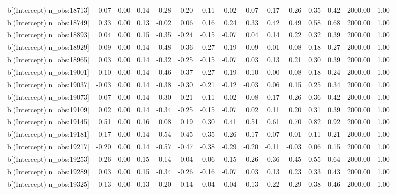 \begin{table}[ht]
\begin{tabular}{rrrrrrrrrrrrrrr}
  b[(Intercept) n\_obs:18713] & 0.07 & 0.00 & 0.14 & -0.28 & -0.20 & -0.11 & -0.02 & 0.07 & 0.17 & 0.26 & 0.35 & 0.42 & 2000.00 & 1.00 \\ 
  b[(Intercept) n\_obs:18749] & 0.33 & 0.00 & 0.13 & -0.02 & 0.06 & 0.16 & 0.24 & 0.33 & 0.42 & 0.49 & 0.58 & 0.68 & 2000.00 & 1.00 \\ 
  b[(Intercept) n\_obs:18893] & 0.04 & 0.00 & 0.15 & -0.35 & -0.24 & -0.15 & -0.07 & 0.04 & 0.14 & 0.22 & 0.32 & 0.39 & 2000.00 & 1.00 \\ 
  b[(Intercept) n\_obs:18929] & -0.09 & 0.00 & 0.14 & -0.48 & -0.36 & -0.27 & -0.19 & -0.09 & 0.01 & 0.08 & 0.18 & 0.27 & 2000.00 & 1.00 \\ 
  b[(Intercept) n\_obs:18965] & 0.03 & 0.00 & 0.14 & -0.32 & -0.25 & -0.15 & -0.07 & 0.03 & 0.13 & 0.21 & 0.30 & 0.39 & 2000.00 & 1.00 \\ 
  b[(Intercept) n\_obs:19001] & -0.10 & 0.00 & 0.14 & -0.46 & -0.37 & -0.27 & -0.19 & -0.10 & -0.00 & 0.08 & 0.18 & 0.24 & 2000.00 & 1.00 \\ 
  b[(Intercept) n\_obs:19037] & -0.03 & 0.00 & 0.14 & -0.38 & -0.30 & -0.21 & -0.12 & -0.03 & 0.06 & 0.15 & 0.25 & 0.34 & 2000.00 & 1.00 \\ 
  b[(Intercept) n\_obs:19073] & 0.07 & 0.00 & 0.14 & -0.30 & -0.21 & -0.11 & -0.02 & 0.08 & 0.17 & 0.26 & 0.36 & 0.42 & 2000.00 & 1.00 \\ 
  b[(Intercept) n\_obs:19109] & 0.02 & 0.00 & 0.14 & -0.34 & -0.25 & -0.15 & -0.07 & 0.02 & 0.11 & 0.20 & 0.31 & 0.39 & 2000.00 & 1.00 \\ 
  b[(Intercept) n\_obs:19145] & 0.51 & 0.00 & 0.16 & 0.08 & 0.19 & 0.30 & 0.41 & 0.51 & 0.61 & 0.70 & 0.82 & 0.92 & 2000.00 & 1.00 \\ 
  b[(Intercept) n\_obs:19181] & -0.17 & 0.00 & 0.14 & -0.54 & -0.45 & -0.35 & -0.26 & -0.17 & -0.07 & 0.01 & 0.11 & 0.21 & 2000.00 & 1.00 \\ 
  b[(Intercept) n\_obs:19217] & -0.20 & 0.00 & 0.14 & -0.57 & -0.47 & -0.38 & -0.29 & -0.20 & -0.11 & -0.03 & 0.06 & 0.15 & 2000.00 & 1.00 \\ 
  b[(Intercept) n\_obs:19253] & 0.26 & 0.00 & 0.15 & -0.14 & -0.04 & 0.06 & 0.15 & 0.26 & 0.36 & 0.45 & 0.55 & 0.64 & 2000.00 & 1.00 \\ 
  b[(Intercept) n\_obs:19289] & 0.03 & 0.00 & 0.15 & -0.34 & -0.26 & -0.16 & -0.07 & 0.03 & 0.13 & 0.23 & 0.33 & 0.43 & 2000.00 & 1.00 \\ 
  b[(Intercept) n\_obs:19325] & 0.13 & 0.00 & 0.13 & -0.20 & -0.14 & -0.04 & 0.04 & 0.13 & 0.22 & 0.29 & 0.38 & 0.46 & 2000.00 & 1.00 \\ 

\end{tabular}
\end{table}
